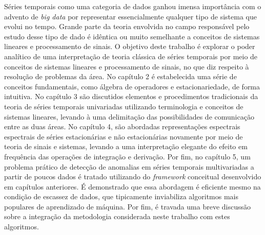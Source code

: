 Séries temporais como uma categoria de dados ganhou imensa importância com o
advento de \emph{big data} por representar essencialmente qualquer tipo de
sistema que evolui no tempo. Grande parte da teoria envolvida no campo
responsável pelo estudo desse tipo de dado é idêntica ou muito semelhante a
conceitos de sistemas lineares e processamento de sinais. O objetivo deste
trabalho é explorar o poder analítico de uma interpretação de teoria clássica
de séries temporais por meio de conceitos de sistemas lineares e processamento
de sinais, no que diz respeito à resolução de problemas da área. No capítulo 2
é estabelecida uma série de conceitos fundamentais, como álgebra de operadores
e estacionariedade, de forma intuitiva. No capítulo 3 são discutidos elementos
e procedimentos tradicionais da teoria de séries temporais univariadas
utilizando terminologia e conceitos de sistemas lineares, levando à uma
delimitação das possibilidades de comunicação entre as duas áreas. No capítulo
4, são abordadas representações espectrais espectrais de séries estacionárias e
não estacionárias novamente por meio de teoria de sinais e sistemas, levando a
uma interpretação elegante do efeito em frequência das operações de integração
e derivação. Por fim, no capítulo 5, um problema prático de detecção de
anomalias em séries temporais multivariadas a partir de poucos dados é tratado
utilizando do \emph{framework} conceitual desenvolvido em capítulos anteriores.
É demonstrado que essa abordagem é eficiente mesmo na condição de escassez de
dados, que tipicamente inviabiliza algoritmos mais populares de aprendizado de
máquina. Por fim, é travada uma breve discussão sobre a integração da
metodologia considerada neste trabalho com estes algoritmos.

\newpage
